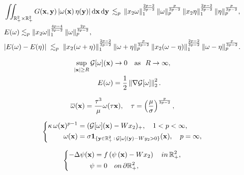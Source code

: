 \documentclass[10pt,a4paper]{amsart}
\theoremstyle{definition}
\theoremstyle{definition}
\numberwithin{equation}{section}
\newcommand{\0}{\emptyset}
\newcommand{\bfx}{{\bf x}}
\newcommand{\bfy}{{\bf y}}
\newcommand{\bbR}{\mathbb R}
\newcommand{\calG}{\mathcal G}
\newcommand{\dd}{\mathrm{d}}
\begin{document}
\setcounter{section}{2}
\setcounter{equation}{9}
\setcounter{theorem}{4}
		\begin{align}
			&\iint_{\bbR^2_+ \times \bbR^2_+} G(\bfx,\bfy)\,|\omega(\bfx)\,\eta(\bfy)|\,\dd\bfx\,\dd\bfy
			\, 
			\lesssim_p \, 
			\|x_2\omega\|_{1}^{\frac{2p-2}{3p-2}}\,
			\|\omega\|_{p}^{\frac{p}{3p-2}}\,
			\|x_2\eta\|_{1}^{\frac{2p-2}{3p-2}}\,
			\|\eta\|_{p}^{\frac{p}{3p-2}},   \label{eq_0704_01}\\
			&E(\omega) 
			\lesssim_p 
			\|x_2\omega\|_{1}^{\frac{4p-4}{3p-2}}\,
			\|\omega\|_{p}^{\frac{2p}{3p-2}},		\label{eq_0704_02}  \\
			&|E(\omega)-E(\eta)| \;
			\lesssim_p\;
			\|x_2(\omega+\eta)\|_{1}^{\frac{2p-2}{3p-2}}\,
			\|\omega+\eta\|_{p}^{\frac{p}{3p-2}}\,
			\|x_2(\omega-\eta)\|_{1}^{\frac{2p-2}{3p-2}}\,
			\|\omega-\eta\|_{p}^{\frac{p}{3p-2}}.  \label{eq_0704_03}
		\end{align}

\setcounter{section}{2}
\setcounter{equation}{12}
\setcounter{theorem}{6}
		\begin{align}
			\sup_{|\bfx| \ge R}\calG[\omega](\bfx)&\to 0 \quad \text{as } \,\, R\to\infty, \label{eq_vanishing} \\
			E(\omega)&=\frac{1}{2}\left\|\nabla \calG[\omega] \right\|_{2}^{2}.  \label{eq_L2energy}
		\end{align}

\setcounter{section}{2}
\setcounter{equation}{16}
\setcounter{theorem}{6}
	\begin{equation}\label{two_scaling}
		\overline{\omega}(\bfx) = \frac{\tau^3}{\mu} \omega(\tau \bfx),\quad \tau=\left(\frac{\mu}{\sigma}\right)^{\frac{p}{3p-2}},
	\end{equation}

\setcounter{section}{3}
\setcounter{equation}{0}
\setcounter{theorem}{0}
	\begin{equation}
		\left\{
		\begin{aligned}
			\kappa \, \omega(\bfx)^{p-1}&=(\mathcal{G}[\omega](\bfx)-Wx_2)_{+},\quad 1<p<\infty,\\
			\omega(\bfx)&=\sigma \mathbf{1}_{\{\bfy\in\mathbb{R}^2_+\,:\,\mathcal{G}[\omega](\bfy)-Wy_2>0 \}}(\mathbf{x}),\quad p=\infty, 
		\end{aligned}
		\right.
		\label{eq: EL}
	\end{equation}

\setcounter{section}{4}
\setcounter{equation}{0}
\setcounter{theorem}{0}
			\begin{equation}
				\left\{
				\begin{aligned}
					-\Delta \psi (\bfx)&= f\left(\psi \left(\bfx \right) - Wx_2  \right)\quad \textrm{ in }\, \bbR^2_+, \\
					\psi&=0 \quad \textrm{ on }\, \partial\bbR^2_+,
				\end{aligned}
				\right.
				\label{eq_ell}
			\end{equation}
\end{document}
